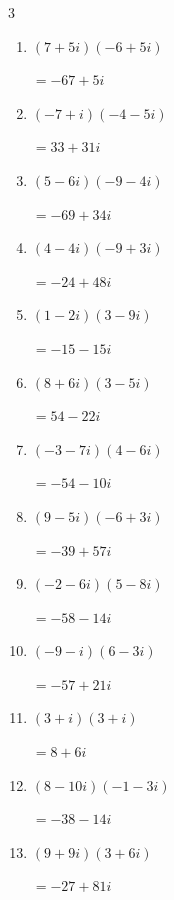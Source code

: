 \begin{multicols}{3}
\begin{enumerate}
        $\displaystyle =73+61i$

  \item $\displaystyle (7+5i)(-6+5i)$

        $\displaystyle =-67+5i$

  \item $\displaystyle (-7+i)(-4-5i)$

        $\displaystyle =33+31i$

  \item $\displaystyle (5-6i)(-9-4i)$

        $\displaystyle =-69+34i$

  \item $\displaystyle (4-4i)(-9+3i)$

        $\displaystyle =-24+48i$

  \item $\displaystyle (1-2i)(3-9i)$

        $\displaystyle =-15-15i$

  \item $\displaystyle (8+6i)(3-5i)$

        $\displaystyle =54-22i$

\columnbreak %

  \item $\displaystyle (-3-7i)(4-6i)$

        $\displaystyle =-54-10i$

  \item $\displaystyle (9-5i)(-6+3i)$

        $\displaystyle =-39+57i$

  \item $\displaystyle (-2-6i)(5-8i)$

        $\displaystyle =-58-14i$

  \item $\displaystyle (-9-i)(6-3i)$

        $\displaystyle =-57+21i$

  \item $\displaystyle (3+i)(3+i)$

        $\displaystyle =8+6i$

  \item $\displaystyle (8-10i)(-1-3i)$

        $\displaystyle =-38-14i$

  \item $\displaystyle (9+9i)(3+6i)$

        $\displaystyle =-27+81i$


\end{enumerate}
\end{multicols}
